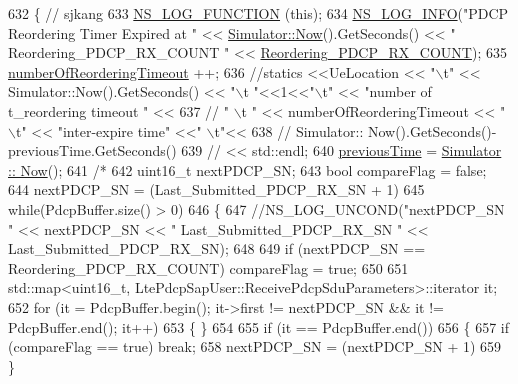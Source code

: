 \begin{DoxyCode}
632                                   \{ \textcolor{comment}{// sjkang}
633   \hyperlink{log-macros-disabled_8h_a90b90d5bad1f39cb1b64923ea94c0761}{NS\_LOG\_FUNCTION} (\textcolor{keyword}{this});
634 \hyperlink{group__logging_gafbd73ee2cf9f26b319f49086d8e860fb}{NS\_LOG\_INFO}(\textcolor{stringliteral}{"PDCP Reordering Timer Expired at "} << \hyperlink{classns3_1_1Simulator_ac3178fa975b419f7875e7105be122800}{Simulator::Now}().GetSeconds() 
      << \textcolor{stringliteral}{" Reordering\_PDCP\_RX\_COUNT "} << \hyperlink{classns3_1_1McUePdcp_a3afa49adcb23a91496bfe00575cf0c53}{Reordering\_PDCP\_RX\_COUNT});
635 \hyperlink{classns3_1_1McUePdcp_a2e69b1e65eeb264dc3c341311bfc4226}{numberOfReorderingTimeout} ++;
636 \textcolor{comment}{//statics <<UeLocation <<  "\(\backslash\)t" << Simulator::Now().GetSeconds() << "\(\backslash\)t  "<<1<<"\(\backslash\)t" << "number of
       t\_reordering timeout " <<}
637 \textcolor{comment}{//              " \(\backslash\)t " << numberOfReorderingTimeout << "\(\backslash\)t" << "inter-expire time" <<" \(\backslash\)t"<<}
638 \textcolor{comment}{//              Simulator:: Now().GetSeconds()-previousTime.GetSeconds()}
639 \textcolor{comment}{//              << std::endl;}
640 \hyperlink{classns3_1_1McUePdcp_aceebe604ff06e04157f6151983568b70}{previousTime} = \hyperlink{classns3_1_1Simulator_ac3178fa975b419f7875e7105be122800}{Simulator :: Now}();
641 \textcolor{comment}{/*}
642 \textcolor{comment}{  uint16\_t nextPDCP\_SN;}
643 \textcolor{comment}{  bool compareFlag = false;}
644 \textcolor{comment}{  nextPDCP\_SN = (Last\_Submitted\_PDCP\_RX\_SN + 1)%
645 \textcolor{comment}{  while(PdcpBuffer.size() > 0)}
646 \textcolor{comment}{  \{}
647 \textcolor{comment}{//NS\_LOG\_UNCOND("nextPDCP\_SN " << nextPDCP\_SN << " Last\_Submitted\_PDCP\_RX\_SN " <<
       Last\_Submitted\_PDCP\_RX\_SN);}
648 \textcolor{comment}{}
649 \textcolor{comment}{    if (nextPDCP\_SN == Reordering\_PDCP\_RX\_COUNT) compareFlag = true;}
650 \textcolor{comment}{}
651 \textcolor{comment}{    std::map<uint16\_t, LtePdcpSapUser::ReceivePdcpSduParameters>::iterator it;}
652 \textcolor{comment}{    for (it = PdcpBuffer.begin(); it->first != nextPDCP\_SN && it != PdcpBuffer.end(); it++)}
653 \textcolor{comment}{    \{ \}}
654 \textcolor{comment}{}
655 \textcolor{comment}{    if (it == PdcpBuffer.end())}
656 \textcolor{comment}{    \{}
657 \textcolor{comment}{      if (compareFlag == true) break;}
658 \textcolor{comment}{      nextPDCP\_SN = (nextPDCP\_SN + 1)%
659 \textcolor{comment}{    \}}
}}
\end{DoxyCode}
